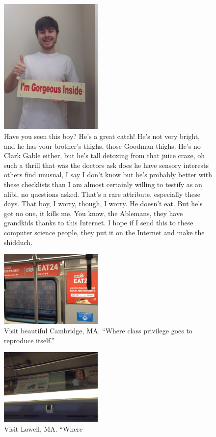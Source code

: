 \begin{figure}
\centering
\includegraphics[width=0.45\textwidth]{figures/ad.jpg}
\caption{Have you seen this boy? He's a great catch! He's not very bright, and he has your brother's thighs, those Goodman thighs. He's no Clark Gable either, but he's \checkmark tall \checkmark detoxing from that juice craze, oh such a thrill that was \checkmark the doctors ask does he have sensory interests others find unusual, I say I don't know but he's probably \checkmark better with these checklists than I am \checkmark almost certainly willing to testify as an alibi, no questions asked. That's a rare attribute, especially these days. That boy, I worry, though, I worry. He doesn't eat. But he's got no one, it kills me. You know, the Ablemans, they have grandkids thanks to this Internet. I hope if I send this to these computer science people, they put it on the Internet and make the shidduch.}
\end{figure}

\begin{figure}
\centering
\includegraphics[width=0.45\textwidth]{figures/cambridge.jpg}
\caption{Visit beautiful Cambridge, MA. ``Where class privilege goes to reproduce itself.''}
\end{figure}

\begin{figure}
\centering
\includegraphics[width=0.45\textwidth]{figures/lowell.jpg}
\caption{Visit Lowell, MA. ``Where}
\end{figure}

